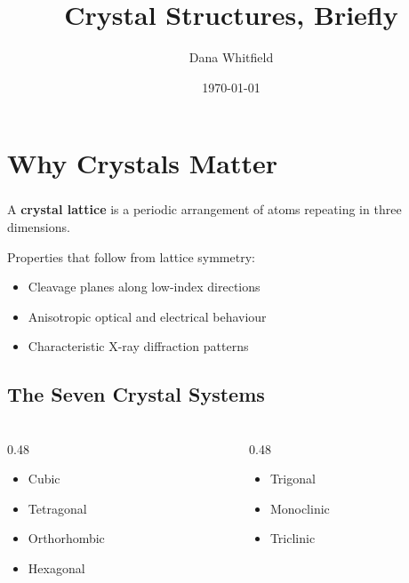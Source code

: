 \documentclass[10pt]{beamer}
\title{Crystal Structures, Briefly}
\author{Dana Whitfield}
\date{\today}
\begin{document}
\geotitle

\section{Why Crystals Matter}

\geosection

\begin{frame}
  \frametitle{\subsecname}

  \begin{definition}
    A \textbf{crystal lattice} is a periodic arrangement of atoms
    repeating in three dimensions.
  \end{definition}
  \vfill
  Properties that follow from lattice symmetry:
  \vfill
  \begin{itemize}
    \item Cleavage planes along low-index directions
    \item Anisotropic optical and electrical behaviour
    \item Characteristic X-ray diffraction patterns
  \end{itemize}
\end{frame}

\subsection{The Seven Crystal Systems}

\begin{frame}
  \frametitle{\subsecname}
  \begin{columns}[T]
    \begin{column}{0.48\textwidth}
      \begin{itemize}
        \item Cubic
        \item Tetragonal
        \item Orthorhombic
        \item Hexagonal
      \end{itemize}
    \end{column}
    \begin{column}{0.48\textwidth}
      \begin{itemize}
        \item Trigonal
        \item Monoclinic
        \item Triclinic
      \end{itemize}
    \end{column}
  \end{columns}
\end{frame}
\end{document}

